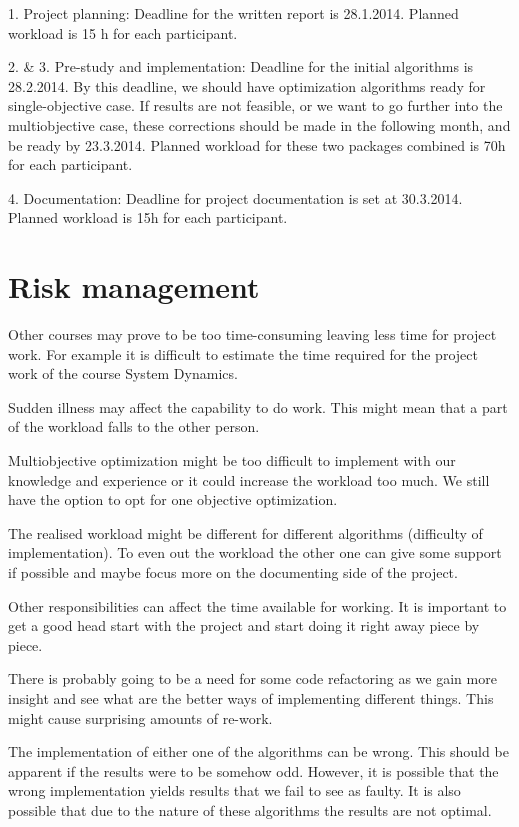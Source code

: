 \documentclass[twoside]{article}
\begin{document}
\begin{multicols}{2}
1. Project planning:
Deadline for the written report is 28.1.2014. Planned workload is 15 h for each participant.

2. \& 3. Pre-study and implementation:
Deadline for the initial algorithms is 28.2.2014. By this deadline, we should have optimization algorithms ready for single-objective case. If results are not feasible, or we want to go further into the multiobjective case, these corrections should be made in the following month, and be ready by 23.3.2014. Planned workload for these two packages combined is 70h for each participant.

4. Documentation:
Deadline for project documentation is set at 30.3.2014. Planned workload is 15h for each participant.







\section{Risk management}
Other courses may prove to be too time-consuming leaving less time for project work. For example it is difficult to estimate the time required for the project work of the course System Dynamics.

Sudden illness may affect the capability to do work. This might mean that a part of the workload falls to the other person.

Multiobjective optimization might be too difficult to implement with our knowledge and experience or it could increase the workload too much. We still have the option to opt for one objective optimization.

The realised workload might be different for different algorithms (difficulty of implementation). To even out the workload the other one can give some support if possible and maybe focus more on the documenting side of the project.

Other responsibilities can affect the time available for working. It is important to get a good head start with the project and start doing it right away piece by piece.

There is probably going to be a need for some code refactoring as we gain more insight and see what are the better ways of implementing different things. This might cause surprising amounts of re-work.

The implementation of either one of the algorithms can be wrong. This should be apparent if the results were to be somehow odd. However, it is possible that the wrong implementation yields results that we fail to see as faulty. It is also possible that due to the nature of these algorithms the results are not optimal.


\end{multicols}
\end{document}
